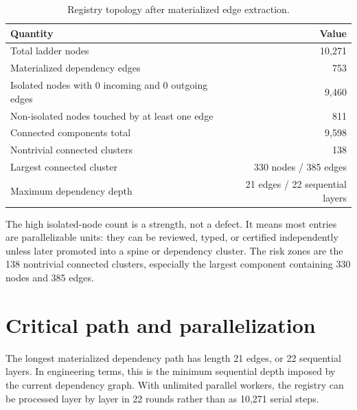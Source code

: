 \documentclass[11pt]{article}
\theoremstyle{remark}
\begin{document}
\begin{table}[H]
\centering
\small
\caption{Registry topology after materialized edge extraction.}
\label{tab:topology}
\begin{tabular}{lr}
\toprule
Quantity & Value \\
\midrule
Total ladder nodes & 10,271 \\
Materialized dependency edges & 753 \\
Isolated nodes with 0 incoming and 0 outgoing edges & 9,460 \\
Non-isolated nodes touched by at least one edge & 811 \\
Connected components total & 9,598 \\
Nontrivial connected clusters & 138 \\
Largest connected cluster & 330 nodes / 385 edges \\
Maximum dependency depth & 21 edges / 22 sequential layers \\
\bottomrule
\end{tabular}
\end{table}

The high isolated-node count is a strength, not a defect. It means most entries are parallelizable units: they can be reviewed, typed, or certified independently unless later promoted into a spine or dependency cluster. The risk zones are the 138 nontrivial connected clusters, especially the largest component containing 330 nodes and 385 edges.

\begin{center}
\end{center}

\section{Critical path and parallelization}
\label{sec:criticalpath}

The longest materialized dependency path has length 21 edges, or 22 sequential layers. In engineering terms, this is the minimum sequential depth imposed by the current dependency graph. With unlimited parallel workers, the registry can be processed layer by layer in 22 rounds rather than as 10,271 serial steps.
\end{document}
